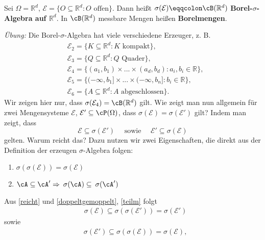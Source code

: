 \begin{beispiel}
	Sei $\Omega = \mathbb{R}^d$, $\mathcal E = \{ O \subseteq \mathbb{R}^d \! : O \text{ offen} \}$. Dann heißt $\sigma(\mathcal E) \eqqcolon \cB(\mathbb{R}^d)$ \textbf{Borel-$\sigma$-Algebra auf $\mathbb{R}^d$}. In $\cB(\mathbb{R}^d)$ messbare Mengen heißen \textbf{Borelmengen}.\smallskip
	
	\textit{Übung:} Die Borel-$\sigma$-Algebra hat viele verschiedene Erzeuger, z. B. 
	\begin{align*}
		&\mathcal E_2 = \{ K \subseteq \mathbb{R}^d \! : \text{$K$ kompakt} \},\\		
		&\mathcal E_3 = \{ Q \subseteq \mathbb{R}^d \! : \text{$Q$ Quader} \},\\
		&\mathcal E_4 = \{ (a_1,b_1)\times...\times(a_d,b_d) \! : a_i, b_i \in \mathbb{R} \},\\
		&\mathcal E_5 = \{ (-\infty,b_1]\times...\times(-\infty,b_n] \! : b_i \in \mathbb{R} \},\\
		&\mathcal E_6 = \{ A \subseteq \mathbb{R}^d \! : \text{$A$ abgeschlossen} \}.
	\end{align*}
	Wir zeigen hier nur, dass $\sigma(\mathcal E_4) = \cB(\mathbb{R}^d)$ gilt. Wie zeigt man nun allgemein für zwei Mengensysteme $\mathcal E$, $\mathcal E' \subseteq \cP(\Omega)$, dass $\sigma(\mathcal E) = \sigma(\mathcal E')$ gilt? Indem man zeigt, dass \begin{equation} \label{reicht}
		\mathcal E \subseteq \sigma(\mathcal E') \quad \text{ sowie } \quad  \mathcal E' \subseteq \sigma(\mathcal E)
	\end{equation} 
	gelten. Warum reicht das? Dazu nutzen wir zwei Eigenschaften, die direkt aus der Definition der erzeugen $\sigma$-Algebra folgen:
	\begin{enumerate}[label=(\roman*)]
		\item \label{doppeltgemoppelt} $\sigma(\sigma(\mathcal E)) = \sigma(\mathcal E)$
		\item \label{teilm} $\cA \subseteq \cA' \Rightarrow \: \sigma(\cA) \subseteq \:  \sigma(\cA')$
	\end{enumerate}
	Aus \eqref{reicht} und \ref{doppeltgemoppelt}, \ref{teilm} folgt \begin{align*}
		&\sigma(\mathcal E) \subseteq \sigma(\sigma(\mathcal E')) = \sigma(\mathcal E')
		\end{align*}
		sowie
		\begin{align*}
		&\sigma(\mathcal E') \subseteq \sigma(\sigma(\mathcal E)) = \sigma(\mathcal E),
	\end{align*}

\end{beispiel}

